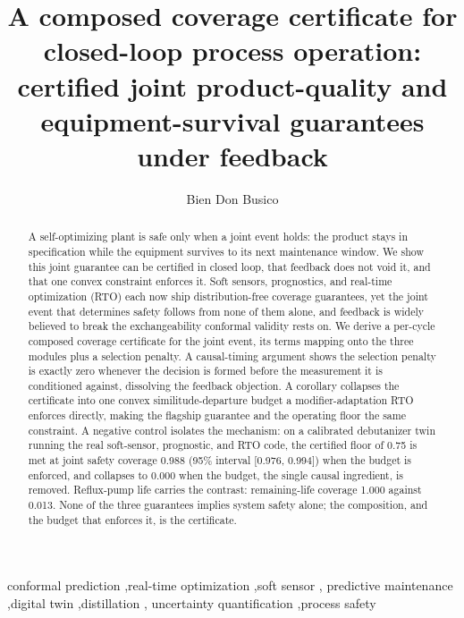 \documentclass[review,12pt]{elsarticle}
\theoremstyle{definition}
\begin{document}
\begin{frontmatter}

\title{A composed coverage certificate for closed-loop process operation:
certified joint product-quality and equipment-survival guarantees under feedback}

\author{Bien Don Busico}
\address{Map\'ua Malayan Colleges Mindanao, Davao City, Philippines}

\begin{abstract}
A self-optimizing plant is safe only when a joint event holds: the product stays in
specification while the equipment survives to its next maintenance window. We show this joint
guarantee can be certified in closed loop, that feedback does not void it, and that one convex
constraint enforces it. Soft sensors, prognostics, and real-time
optimization (RTO) each now ship distribution-free coverage guarantees, yet the joint event that
determines safety follows from none of them alone, and feedback is widely believed to break the
exchangeability conformal validity rests on. We derive a per-cycle composed coverage certificate
for the joint event, its terms mapping onto the three modules plus a selection penalty. A
causal-timing argument shows the selection penalty is exactly zero whenever the decision is formed
before the measurement it is conditioned against, dissolving the feedback objection. A corollary
collapses the certificate into one convex similitude-departure budget a modifier-adaptation RTO
enforces directly, making the flagship guarantee and the operating floor the same constraint. A
negative control isolates the mechanism: on a calibrated debutanizer twin running the real
soft-sensor, prognostic, and RTO code, the certified floor of 0.75 is met at joint safety coverage
0.988 (95\% interval [0.976, 0.994]) when the budget is enforced, and collapses to 0.000 when the
budget, the single causal ingredient, is removed. Reflux-pump life carries the contrast:
remaining-life coverage 1.000 against 0.013. None of the three guarantees implies system safety
alone; the composition, and the budget that enforces it, is the certificate.

\end{abstract}

\begin{keyword}
conformal prediction \sep real-time optimization \sep soft sensor \sep
predictive maintenance \sep digital twin \sep distillation \sep
uncertainty quantification \sep process safety
\end{keyword}

\end{frontmatter}
\linenumbers
\end{document}
